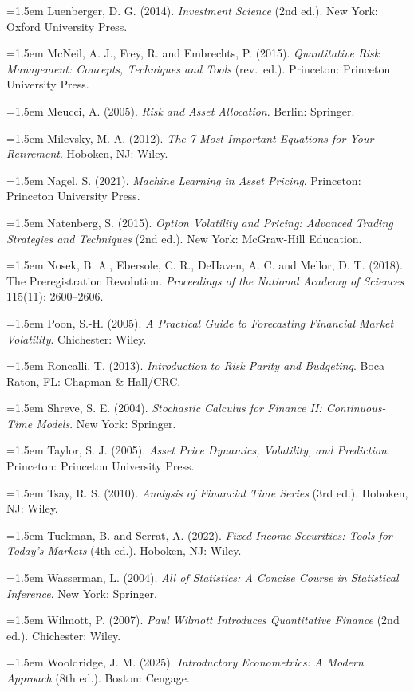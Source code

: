 \hangindent=1.5em Luenberger, D. G. (2014). \emph{Investment Science} (2nd ed.). New York: Oxford University Press.

\hangindent=1.5em McNeil, A. J., Frey, R. and Embrechts, P. (2015). \emph{Quantitative Risk Management: Concepts, Techniques and Tools} (rev.\ ed.). Princeton: Princeton University Press.

\hangindent=1.5em Meucci, A. (2005). \emph{Risk and Asset Allocation}. Berlin: Springer.

\hangindent=1.5em Milevsky, M. A. (2012). \emph{The 7 Most Important Equations for Your Retirement}. Hoboken, NJ: Wiley.

\hangindent=1.5em Nagel, S. (2021). \emph{Machine Learning in Asset Pricing}. Princeton: Princeton University Press.

\hangindent=1.5em Natenberg, S. (2015). \emph{Option Volatility and Pricing: Advanced Trading Strategies and Techniques} (2nd ed.). New York: McGraw-Hill Education.

\hangindent=1.5em Nosek, B. A., Ebersole, C. R., DeHaven, A. C. and Mellor, D. T. (2018). The Preregistration Revolution. \emph{Proceedings of the National Academy of Sciences} 115(11): 2600--2606.

\hangindent=1.5em Poon, S.-H. (2005). \emph{A Practical Guide to Forecasting Financial Market Volatility}. Chichester: Wiley.

\hangindent=1.5em Roncalli, T. (2013). \emph{Introduction to Risk Parity and Budgeting}. Boca Raton, FL: Chapman \& Hall/CRC.

\hangindent=1.5em Shreve, S. E. (2004). \emph{Stochastic Calculus for Finance II: Continuous-Time Models}. New York: Springer.

\hangindent=1.5em Taylor, S. J. (2005). \emph{Asset Price Dynamics, Volatility, and Prediction}. Princeton: Princeton University Press.

\hangindent=1.5em Tsay, R. S. (2010). \emph{Analysis of Financial Time Series} (3rd ed.). Hoboken, NJ: Wiley.

\hangindent=1.5em Tuckman, B. and Serrat, A. (2022). \emph{Fixed Income Securities: Tools for Today's Markets} (4th ed.). Hoboken, NJ: Wiley.

\hangindent=1.5em Wasserman, L. (2004). \emph{All of Statistics: A Concise Course in Statistical Inference}. New York: Springer.

\hangindent=1.5em Wilmott, P. (2007). \emph{Paul Wilmott Introduces Quantitative Finance} (2nd ed.). Chichester: Wiley.

\hangindent=1.5em Wooldridge, J. M. (2025). \emph{Introductory Econometrics: A Modern Approach} (8th ed.). Boston: Cengage.
\par\endgroup
